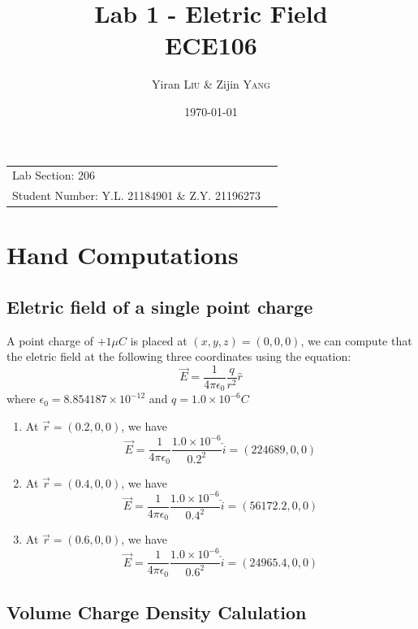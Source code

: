 \documentclass[
	letterpaper, %
	11pt, %
]{CSUniSchoolLabReport}
\title{Lab 1 - Eletric Field  \\ ECE106} %
\author{Yiran \textsc{Liu} \&  Zijin \textsc{Yang}} %
\date{\today} %
\begin{document}
\maketitle %

\begin{center}
	\begin{tabular}{l r}
      Lab Section: 206 \\
      Student Number: Y.L. 21184901 \& Z.Y. 21196273
	\end{tabular}
\end{center}

\section{Hand Computations}

\subsection{Eletric field of a single point charge}

A point charge of $+1\mu C$ is placed at $(x, y, z) = (0, 0, 0)$, we can compute that the eletric field at the following three coordinates using the equation:
$$
  \vec{E} = \frac{1}{4\pi\epsilon_{0}} \frac{q}{r^2}\hat{r}
$$
where $\epsilon_{0} = 8.854187 \times 10^{-12}$ and $q = 1.0 \times 10^{-6} C$

\begin{enumerate}
  \item At $\vec{r} = (0.2, 0, 0)$, we have 
    $$
    \vec{E} = \frac{1}{4 \pi \epsilon_{0}} \frac{1.0 \times 10^{-6}}{0.2^2} \hat{i} = (224689, 0, 0)
    $$
  \item At $\vec{r} = (0.4, 0, 0)$, we have 
    $$
    \vec{E} = \frac{1}{4 \pi \epsilon_{0}} \frac{1.0 \times 10^{-6}}{0.4^2} \hat{i} = (56172.2, 0, 0)
    $$
  \item At $\vec{r} = (0.6, 0, 0)$, we have 
    $$
    \vec{E} = \frac{1}{4 \pi \epsilon_{0}} \frac{1.0 \times 10^{-6}}{0.6^2} \hat{i} = (24965.4, 0, 0)
    $$
\end{enumerate}


\subsection{Volume Charge Density Calulation}
\end{document}
